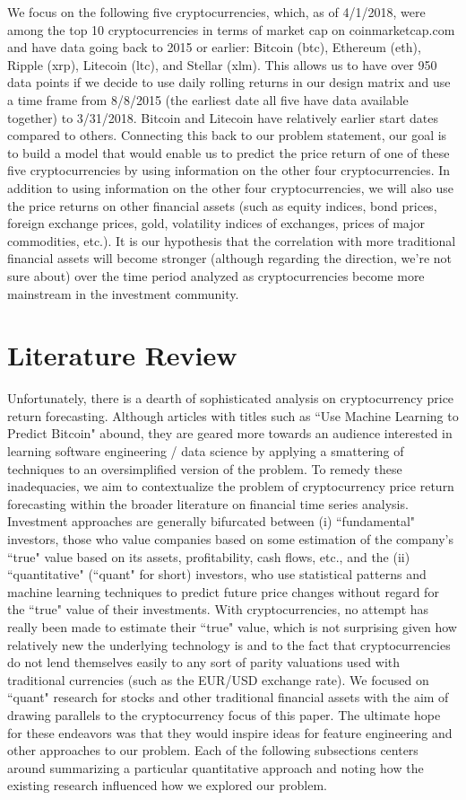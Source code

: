 \documentclass[12pt,twoside]{article}
\begin{document}
We focus on the following five cryptocurrencies, which, as of 4/1/2018, were among the top 10 cryptocurrencies in terms of market cap on coinmarketcap.com and have data going back to 2015 or earlier: Bitcoin (btc), Ethereum (eth), Ripple (xrp), Litecoin (ltc), and Stellar (xlm). This allows us to have over 950 data points if we decide to use daily rolling returns in our design matrix and use a time frame from 8/8/2015 (the earliest date all five have data available together) to 3/31/2018. Bitcoin and Litecoin have relatively earlier start dates compared to others. Connecting this back to our problem statement, our goal is to build a model that would enable us to predict the price return of one of these five cryptocurrencies by using information on the other four cryptocurrencies.
\bigbreak
In addition to using information on the other four cryptocurrencies, we will also use the price returns on other financial assets (such as equity indices, bond prices, foreign exchange prices, gold, volatility indices of exchanges, prices of major commodities, etc.). It is our hypothesis that the correlation with more traditional financial assets will become stronger (although regarding the direction, we’re not sure about) over the time period analyzed as cryptocurrencies become more mainstream in the investment community.

\section{Literature Review}

Unfortunately, there is a dearth of sophisticated analysis on cryptocurrency price return forecasting. Although articles with titles such as ``Use Machine Learning to Predict Bitcoin" abound, they are geared more towards an audience interested in learning software engineering / data science by applying a smattering of techniques to an oversimplified version of the problem. To remedy these inadequacies, we aim to contextualize the problem of cryptocurrency price return forecasting within the broader literature on financial time series analysis.
\bigbreak
Investment approaches are generally bifurcated between (i) ``fundamental" investors, those who value companies based on some estimation of the company's ``true" value based on its assets, profitability, cash flows, etc., and the (ii) ``quantitative" (``quant" for short) investors, who use statistical patterns and machine learning techniques to predict future price changes without regard for the ``true" value of their investments. With cryptocurrencies, no attempt has really been made to estimate their ``true" value, which is not surprising given how relatively new the underlying technology is and to the fact that cryptocurrencies do not lend themselves easily to any sort of parity valuations used with traditional currencies (such as the EUR/USD exchange rate). We focused on ``quant" research for stocks and other traditional financial assets with the aim of drawing parallels to the cryptocurrency focus of this paper. The ultimate hope for these endeavors was that they would inspire ideas for feature engineering and other approaches to our problem. Each of the following subsections centers around summarizing a particular quantitative approach and noting how the existing research influenced how we explored our problem.
\end{document}
